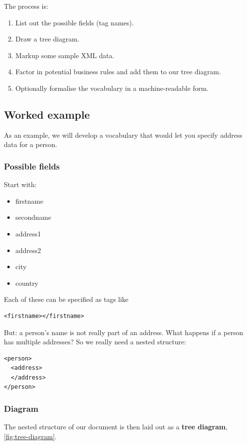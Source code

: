 \documentclass{pgnotes}
\begin{document}
The process is:

\begin{enumerate}
\item List out the possible fields (tag names).
\item Draw a tree diagram.
\item Markup some sample XML data.
\item Factor in potential business rules and add them to our tree diagram. 
\item Optionally formalise the vocabulary in a machine-readable form.
\end{enumerate}

\subsection{Worked example}

As an example, we will develop a vocabulary that would let you specify address data for a person.

\subsubsection{Possible fields}
Start with:
\begin{itemize}
\item firstname
\item secondname
\item address1
\item address2
\item city
\item country
\end{itemize}

Each of these can be specified as tags like
\begin{verbatim}
<firstname></firstname>
\end{verbatim}

But: a person's name is not really part of an address.
What happens if a person has multiple addresses?
So we really need a nested structure:
\begin{verbatim}
<person>
  <address>
  </address>
</person>
\end{verbatim}


\subsubsection{Diagram}

The nested structure of our document is then laid out as a \textbf{tree diagram}, \autoref{fig:tree-diagram}. 
\end{document}
